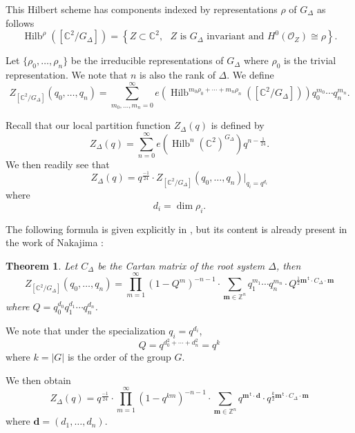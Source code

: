 \documentclass{amsart}
\newtheorem{theorem}{Theorem}[section]
\theoremstyle{definition}
\newcommand{\half}{\frac{1}{2}}
\newcommand{\CC} {{\mathbb C}}          %
\newcommand{\ZZ} {{\mathbb Z}}		%
\renewcommand{\O}{\mathcal{O}}
\renewcommand{\top}{\,\mathsf{t}}
\newcommand{\mvec}{\bm{m}}
\newcommand{\dvec}{\bm{d }}
\newcommand{\Hilb}{\operatorname{Hilb}}
\begin{document}
This Hilbert scheme has components indexed by representations $\rho$
of $G_{\Delta}$ as follows
\begin{equation*}
\Hilb^{\rho} \left([\CC^{2}/G_{\Delta}] \right) = \left\{ Z\subset
\CC^{2}, \text{ $Z$ is $G_{\Delta}$ invariant and $H^{0}(\O_{Z})\cong
\rho $} \right\}.
\end{equation*}

Let $\{\rho_{0},\dotsc ,\rho_{n} \}$ be the irreducible
representations of $G_{\Delta}$ where $\rho_{0}$ is the trivial
representation. We note that $n$ is also the rank of $\Delta$. We
define
\[
Z_{[\CC^{2}/G_{\Delta}]} (q_{0},\dotsc ,q_{n}) = \sum_{m_{0},\dotsc
,m_{n}=0}^{\infty} e\left(\Hilb^{m_{0}\rho_{0}+\dotsb
+m_{n}\rho_{n}}([\CC^{2}/G_{\Delta}]) \right) q_{0}^{m_{0}}\dotsb
q_{n}^{m_{n}} .
\]

Recall that our local partition function $Z_{\Delta}(q)$ is defined by
\[
Z_{\Delta}(q) = \sum_{n=0}^{\infty}
e\left(\Hilb^{n}(\CC^{2})^{G_{\Delta}} \right) q^{n-\frac{1}{24}}. 
\]
We then readily see that
\[
Z_{\Delta}(q) = q^{\frac{-1}{24}}\cdot  Z_{[\CC^{2}/G_{\Delta}]}
(q_{0},\dotsc ,q_{n})|_{q_{i}=q^{d_{i}}}
\]
where
\[
d_{i} =\dim \rho_{i}.
\]

The following formula is given explicitly in \cite[Thm~1.3]{gyenge2015euler}, but its content is already present in the work of Nakajima \cite{nakajima2002geometric}:
\begin{theorem} \label{thm: Zorbifold formula}
Let $C_{\Delta}$ be the Cartan matrix of the root system $\Delta$,
then 
\[
Z_{[\CC^{2}/G_{\Delta}]} (q_{0},\dotsc ,q_{n}) = \prod_{m=1}^{\infty}
(1-Q^{m})^{-n-1} \cdot \sum_{\mvec \in \ZZ^{n}} q_{1}^{m_{1}}\dotsb
q_{n}^{m_{n}} \cdot Q^{\half \mvec^{\top}\cdot C_{\Delta}\cdot \mvec}
\]
where $Q=q_{0}^{d_{0}}q_{1}^{d_{1}}\dotsb q_{n}^{d_{n}}$.
\end{theorem}
We note that under the specialization $q_{i}=q^{d_{i}}$, 
\[
Q=q^{d_{0}^{2}+\dotsb +d_{n}^{2}} = q^{k}
\]
where $k=|G|$ is the order of the group $G$.

We then obtain
\[
Z_{\Delta}(q) = q^{\frac{-1}{24}}\cdot
\prod_{m=1}^{\infty}(1-q^{km})^{-n-1} \cdot \sum_{\mvec \in \ZZ^{n}}
q^{\mvec^{\top}\cdot \dvec} \cdot q^{\frac{k}{2}\mvec^{\top}\cdot C_{\Delta}\cdot \mvec}
\]
where $\dvec =(d_{1},\dotsc ,d_{n})$.
\end{document}
